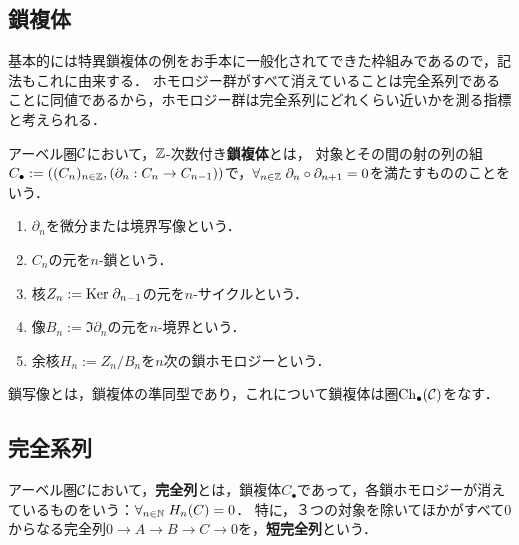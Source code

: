 \documentclass[uplatex,dvipdfmx]{jsreport}
\begin{document}
\subsection{鎖複体}

\begin{tcolorbox}[colframe=ForestGreen, colback=ForestGreen!10!white,breakable,colbacktitle=ForestGreen!40!white,coltitle=black,fonttitle=\bfseries\sffamily,
title=]
    基本的には特異鎖複体の例をお手本に一般化されてできた枠組みであるので，記法もこれに由来する．
    ホモロジー群がすべて消えていることは完全系列であることに同値であるから，ホモロジー群は完全系列にどれくらい近いかを測る指標と考えられる．
\end{tcolorbox}

\begin{definition}
    アーベル圏$\mathcal{C}$において，$\mathbb{Z}$-次数付き\textbf{鎖複体}とは，
    対象とその間の射の列の組$C_\bullet:=((C_n)_{n\in\mathbb{Z}},(\partial_n:C_n\to C_{n-1}))$で，$\forall_{n\in\mathbb{Z}}\;\partial_n\circ\partial_{n+1}=0$を満たすもののことをいう．
    \begin{enumerate}
        \item $\partial_n$を微分または境界写像という．
        \item $C_n$の元を$n$-鎖という．
        \item 核$Z_n:=\mathrm{Ker}\;\partial_{n-1}$の元を$n$-サイクルという．
        \item 像$B_n:=\Im\partial_n$の元を$n$-境界という．
        \item 余核$H_n:=Z_n/B_n$を$n$次の鎖ホモロジーという．
    \end{enumerate}
\end{definition}

\begin{definition}
    鎖写像とは，鎖複体の準同型であり，これについて鎖複体は圏$\mathrm{Ch}_\bullet(\mathcal{C})$をなす．
\end{definition}

\subsection{完全系列}

\begin{definition}
    アーベル圏$\mathcal{C}$において，\textbf{完全列}とは，鎖複体$C_\bullet$であって，各鎖ホモロジーが消えているものをいう：$\forall_{n\in\mathbb{N}}\;H_n(C)=0$．
    特に，３つの対象を除いてほかがすべて$0$からなる完全列$0\to A\to B\to C\to 0$を，\textbf{短完全列}という．
\end{definition}
\end{document}
